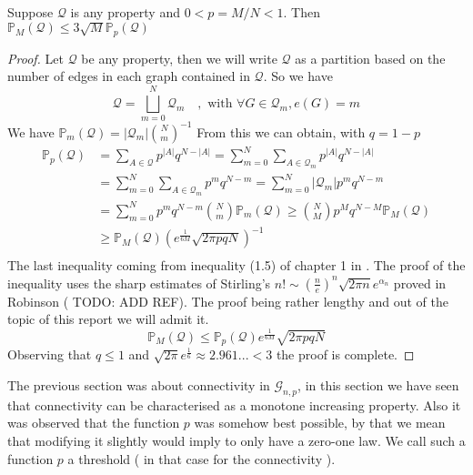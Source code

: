 \begin{theorem}\label{th:linkMP}
	Suppose $\mathcal{Q}$ is any property and $0 < p = M/N< 1$. 
	\newline
	Then $\mathbb{P}_M(\mathcal{Q}) \leq 3 \sqrt{M}\mathbb{P}_p(\mathcal{Q})$
\end{theorem}
\begin{proof}
	Let $\mathcal{Q}$ be any property, then we will write $\mathcal{Q}$ as a partition based on the number of edges in each graph contained in $\mathcal{Q}$.
	\newline
	So we have
	$$\mathcal{Q} = \bigsqcup_{m=0}^{N} \mathcal{Q}_m \quad, \text{ with } \forall G \in \mathcal{Q}_m, e(G) = m$$
	We have $\mathbb{P}_m(\mathcal{Q}) = |\mathcal{Q}_m| \binom{N}{m}^{-1}$
	From this we can obtain, with $q = 1 - p$
	\begin{align*}
		\mathbb{P}_p(\mathcal{Q})	&= \sum_{A \in \mathcal{Q}} p^{|A|}q^{N-|A|}
						= \sum_{m=0}^{N}\sum_{A \in \mathcal{Q}_m} p^{|A|}q^{N-|A|}\\
						&= \sum_{m=0}^{N}\sum_{A \in \mathcal{Q}_m} p^{m}q^{N-m}
						= \sum_{m=0}^{N}|\mathcal{Q}_m|p^{m}q^{N-m}\\
						&= \sum_{m=0}^N p^mq^{N-m}\binom{N}{m}\mathbb{P}_m(\mathcal{Q}) 
						\geq \binom{N}{M}p^Mq^{N-M}\mathbb{P}_M(\mathcal{Q}) \\
						&\geq \mathbb{P}_M(\mathcal{Q})(e^{\frac{1}{6M}}\sqrt{2\pi p q N})^{-1}\\
	\end{align*}
	The last inequality coming from inequality (1.5) of chapter 1 in \cite{Bollob01}. The proof of the inequality uses the sharp estimates of Stirling's $n! \sim (\frac{n}{e})^n\sqrt{2\pi n}e^{\alpha_n}$ proved in Robinson ( TODO: ADD REF). 
	The proof being rather lengthy and out of the topic of this report we will admit it.
	\begin{equation}
		\mathbb{P}_M(\mathcal{Q}) \leq  \mathbb{P}_p(\mathcal{Q})e^{\frac{1}{6M}}\sqrt{2\pi pq N}
	\end{equation}
	Observing that $q \leq 1$ and $\sqrt{2\pi}e^{\frac{1}{6}} \approx 2.961... < 3$ the proof is complete.
\end{proof}
The previous section was about connectivity in $\mathcal{G}_{n,p}$, in this section we have seen that connectivity can be characterised as a monotone increasing property.
Also it was observed that the function $p$ was somehow best possible, by that we mean that modifying it slightly would imply to only have a zero-one law. 
We call such a function $p$ a threshold ( in that case for the connectivity ). 
\newline

